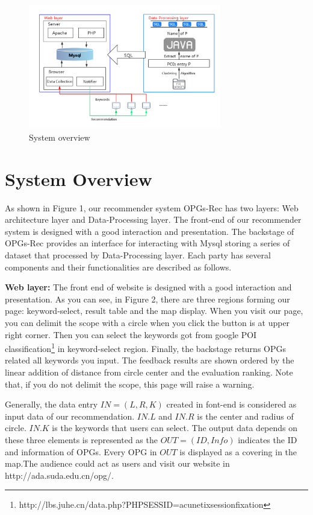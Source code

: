 \documentclass[envcountreset,oribibl]{llncs}
\begin{document}
\begin{figure}
   \centering
    \includegraphics [width=0.75\textwidth] {pics/System.pdf}
\caption{System overview}
\label{fig:reputation}
\end{figure}


\section{System Overview} \label{sec:model}
As shown in Figure 1, our recommender system OPGs-Rec has two layers: Web architecture layer and Data-Processing layer. The front-end of our recommender system is designed with a good interaction and presentation. The backstage of OPGs-Rec provides an interface for interacting with Mysql storing a series of dataset that processed by Data-Processing layer. Each party has several components and their functionalities are described as follows.

\textbf{Web layer:}
The front end of website is designed with a good interaction and presentation. As you can see, in Figure 2, there are three regions forming our page: keyword-select, result table and the map display. When you visit our page, you can delimit the scope with a circle when you click the button is at upper right corner. Then you can select the keywords got from google POI classification\footnote{http://lbs.juhe.cn/data.php?PHPSESSID=acunetixsessionfixation} in keyword-select region. Finally, the backstage returns OPGs related all keywords you input. The feedback results are shown ordered by the linear addition of distance from circle center and the evaluation ranking. Note that, if you do not delimit the scope, this page will raise a warning. 

Generally, the data entry $IN = (L, R, K)$ created in font-end is considered as input data of our recommendation. $IN.L$ and $IN.R$ is the center and radius of circle. $IN.K$ is the keywords that users can select. The output data depends on these three elements is represented as the $OUT=(ID, Info)$ indicates the ID and information of OPGs. Every OPG in $OUT$ is displayed as a covering in the map.The audience could act as users and visit our website in http://ada.suda.edu.cn/opg/. 
\end{document}
